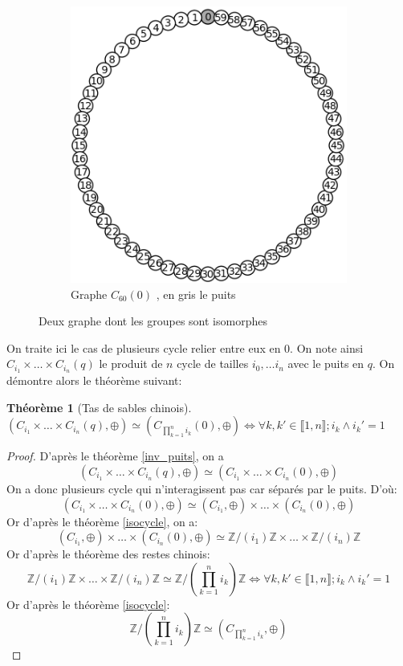 \documentclass{report}
\newtheorem{theorem}{Théorème}[chapter]
\newcommand{\plus}{\ensuremath{\oplus}}
\begin{document}
\begin{figure}[h]
\begin{center}
\begin{subfigure}[b]{0.1\textwidth}
   \includegraphics[width=3\linewidth, scale=2]{mcycle2.png}
   \caption{Graphe $C_60(0)$ , en gris le puits}
\end{subfigure}
\caption{Deux graphe dont les groupes sont isomorphes}
\end{center}
\end{figure}


On traite ici le cas de plusieurs cycle relier entre eux en 0. On note ainsi $C_{i_1} \times \hdots \times C_{i_n}(q)$ le produit de $n$ cycle de tailles $i_0, \hdots i_n$ avec le puits en $q$. On démontre alors le théorème suivant:
\begin{theorem} [Tas de sables chinois]
$(C_{i_1} \times \hdots \times C_{i_n}(q), \plus{}) \simeq (C_{\prod_{k=1}^{n} i_k}(0), \plus{}) \Leftrightarrow \forall k, k' \in \llbracket 1, n \rrbracket; i_k \land i_k' = 1$
\end{theorem}

\begin{proof}
D'après le théorème \ref{inv_puits}, on a $$(C_{i_1} \times \hdots \times C_{i_n}(q), \plus{}) \simeq (C_{i_1} \times \hdots \times C_{i_n}(0), \plus{})$$
On a donc plusieurs cycle qui n'interagissent pas car séparés par le puits. D'où: $$(C_{i_1} \times \hdots \times C_{i_n}(0), \plus{}) \simeq (C_{i_1}, \plus{}) \times \hdots \times (C_{i_n}(0), \plus{})$$
Or d'après le théorème \ref{isocycle}, on a:
$$(C_{i_1}, \plus{}) \times \hdots \times (C_{i_n}(0), \plus{}) \simeq \mathbb{Z}/(i_1)\mathbb{Z} \times \hdots \times \mathbb{Z}/(i_n)\mathbb{Z}$$
Or d'après le théorème des restes chinois:
$$\mathbb{Z}/(i_1)\mathbb{Z} \times \hdots \times \mathbb{Z}/(i_n)\mathbb{Z} \simeq \mathbb{Z}/ (\prod_{k=1}^{n} i_k)\mathbb{Z} \Leftrightarrow \forall k, k' \in \llbracket 1, n \rrbracket; i_k \land i_k' = 1$$
Or d'après le théorème \ref{isocycle}:
$$\mathbb{Z}/ (\prod_{k=1}^{n} i_k)\mathbb{Z} \simeq (C_{\prod_{k=1}^{n} i_k}, \plus{})$$
\end{proof}
\end{document}
